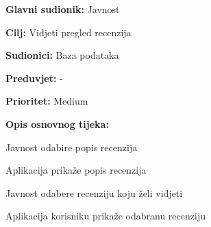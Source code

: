 \noindent {}
	\begin{packed_item}
	
		\item \textbf{Glavni sudionik: }Javnost
		\item  \textbf{Cilj:} Vidjeti pregled recenzija
		\item  \textbf{Sudionici:} Baza podataka
		\item  \textbf{Preduvjet:} -
		\item  \textbf{Prioritet:} Medium
		\item  \textbf{Opis osnovnog tijeka:}
		
		\item[] \begin{packed_enum}
			\item Javnost odabire popis recenzija
			\item Aplikacija prikaže popis recenzija
			\item Javnost odabere recenziju koju želi vidjeti
			\item Aplikacija korisniku prikaže odabranu recenziju
		\end{packed_enum}
	\end{packed_item}

